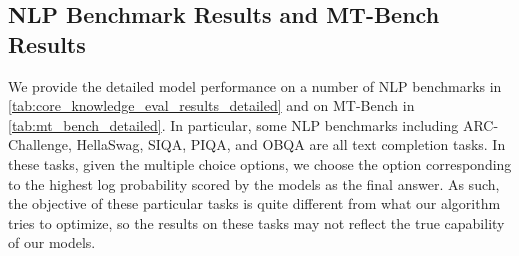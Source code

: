 \documentclass{article}
\begin{document}
\begin{table}[h]
\footnotesize
\setlength{\tabcolsep}{4pt}
    \caption{
    {\textbf{MT-Bench Fine-grained Results}. We list our models' performance on each problem category. Self-reward is especially effective in improving the model's ability in writing, role-playing, extraction, and STEM tasks.}}
    \vspace{2mm}
  \label{tab:mt_bench_detailed}
  \centering
\end{table}



\subsection{NLP Benchmark Results and MT-Bench Results}
We provide the detailed model performance on a number of NLP benchmarks in \autoref{tab:core_knowledge_eval_results_detailed} and on MT-Bench in \autoref{tab:mt_bench_detailed}. In particular, some NLP benchmarks including ARC-Challenge, HellaSwag, SIQA, PIQA, and OBQA are all text completion tasks. In these tasks, given the multiple choice options, we choose the option corresponding to the highest log probability scored by the models as the final answer. As such, the objective of these particular tasks is quite different from what our algorithm tries to optimize, so the results on these tasks may not reflect the true capability of our models.
\end{document}
